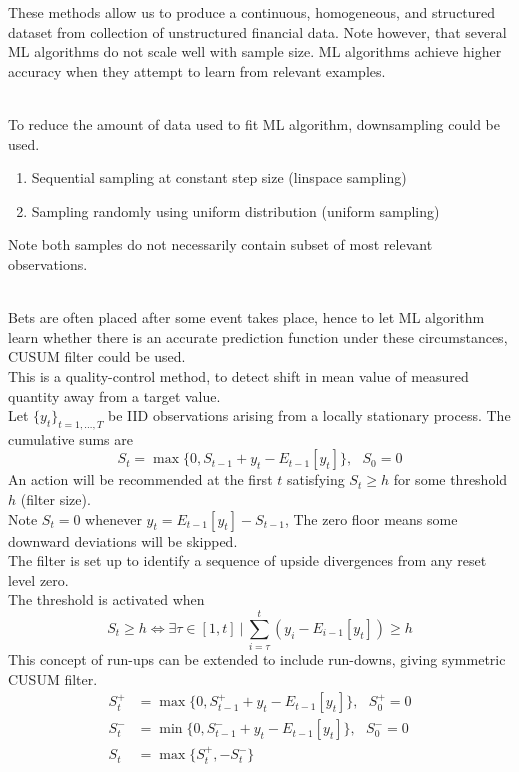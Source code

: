 These methods allow us to produce a continuous, homogeneous, and structured dataset from collection of unstructured financial data. Note however, that several ML algorithms do not scale well with sample size. ML algorithms achieve higher accuracy when they attempt to learn from relevant examples.

\begin{method} \\
To reduce the amount of data used to fit ML algorithm, downsampling could be used.
\begin{enumerate}[label=\roman*.]
\setlength{\itemsep}{0pt}
\item Sequential sampling at constant step size (linspace sampling)
\item Sampling randomly using uniform distribution (uniform sampling)
\end{enumerate}
Note both samples do not necessarily contain subset of most relevant observations.
\end{method}

\begin{method}  \\
Bets are often placed after some event takes place, hence to let ML algorithm learn whether there is an accurate prediction function under these circumstances, CUSUM filter could be used.\\
This is a quality-control method, to detect shift in mean value of measured quantity away from a target value.\\
Let $\{y_t\}_{t=1, \ldots, T}$ be IID observations arising from a locally stationary process. The cumulative sums are
\begin{equation*}
S_t = \max \{0, S_{t-1} + y_t - E_{t-1} [y_t] \}, \ \ \ S_0 = 0 \nonumber
\end{equation*}
An action will be recommended at the first $t$ satisfying $S_t \geq h$ for some threshold $h$ (filter size).\\
Note $S_t = 0$ whenever $y_t = E_{t-1}[y_t] - S_{t-1}$, The zero floor means some downward deviations will be skipped.\\
The filter is set up to identify a sequence of upside divergences from any reset level zero.\\
The threshold is activated when
\begin{equation*}
S_t \geq h \Leftrightarrow \exists \tau \in [1, t] \ \vert \ \sum\limits_{i=\tau}^t (y_i - E_{i-1}[y_t]) \geq h \nonumber
\end{equation*}
This concept of run-ups can be extended to include run-downs, giving symmetric CUSUM filter.
\begin{align}
S^+_t &= \max \{0, S^+_{t-1} + y_t - E_{t-1}[y_t] \}, \ \ \ S^+_0 = 0 \nonumber \\
S^-_t &= \min \{0, S^-_{t-1} + y_t - E_{t-1}[y_t] \}, \ \ \ S^-_0 = 0 \nonumber \\
S_t &= \max \{S^+_t, -S^-_t \} \nonumber
\end{align}
\end{method}